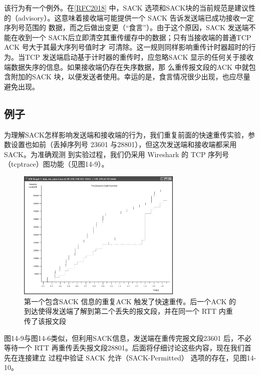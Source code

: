 该行为有一个例外。在\href{https://www.rfc-editor.org/rfc/rfc2018}{[RFC2018]} 中，SACK 选项和SACK块的当前规范是建议性的（advisory）。这意味着接收端可能提供一个 SACK 告诉发送端已成功接收一定序列号范围的
数据，而之后做出变更（“食言”）。由于这个原因，SACK 发送端不能在收到一个 SACK后立即清空其重传缓存中的数据；只有当接收端的普通TCP ACK 号大于其最大序列号值时才
可清除。这一规则同样影响重传计时器超时的行为。当TCP 发送端启动基于计时器的重传时，应忽略SACK 显示的任何关于接收端数据失序的信息。如果接收端仍存在失序数据，那
么重传报文段的ACK 中就包含附加的SACK 块，以便发送者使用。幸运的是，食言情况很少出现，也应尽量避免出现。

\subsection{例子}
为理解SACK怎样影响发送端和接收端的行为，我们重复前面的快速重传实验，参数设置也如前（丢掉序列号 23601 与28801），但这次发送端和接收端都采用SACK。为准确观测
到实验过程，我们仍采用 Wireshark 的 TCP 序列号（tcptrace）图功能（见图14-9）。
\begin{figure}[!htb]
    \centering
	\includegraphics[width=0.7\textwidth]{imgs/14/14-9.png}
	\caption{第一个包含SACK 信息的重复ACK 触发了快速重传。后一个ACK 的到达使得发送端了解到第二个丢失的报文段，并在同一个 RTT 内重传了该报文段}
\end{figure}

图14-9与图14-6类似，但利用SACK信息，发送端在重传完报文段23601 后，不必等待一个 RTT 再重传丢失报文段28801。后面将仔细讨论这些内容，现在我们首先在连接建立
过程中验证 SACK 允许（SACK-Permitted） 选项的存在，见图14-10。

